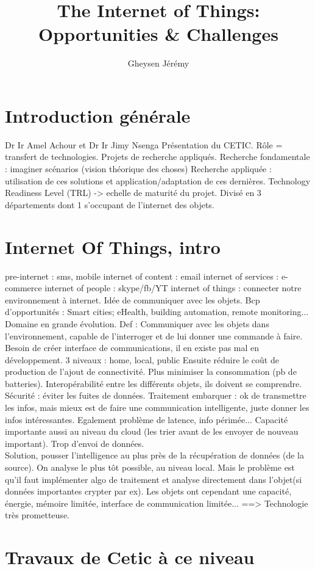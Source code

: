 \documentclass[10pt,a4paper]{article}
\author{Gheysen Jérémy}
\title{The Internet of Things: Opportunities \& Challenges}
\begin{document}
\maketitle
\newpage
\section{Introduction générale}
Dr Ir Amel Achour et Dr Ir Jimy Nsenga
Présentation du CETIC. Rôle = transfert de technologies. Projets de recherche appliqués. 
Recherche fondamentale : imaginer scénarios (vision théorique des choses)
Recherche appliquée : utilisation de ces solutions et application/adaptation de ces dernières. 
Technology Readiness Level (TRL) -> echelle de maturité du projet. 
Divisé en 3 départements dont 1 s'occupant de l'internet des objets.
\section{Internet Of Things, intro}
pre-internet : sms, mobile 
internet of content : email
internet of services : e-commerce
internet of people : skype/fb/YT
internet of things : connecter notre environnement à internet. Idée de communiquer avec les objets. 
Bcp d'opportunités : Smart cities; eHealth, building automation, remote monitoring... Domaine en grande évolution. 
Def : Communiquer avec les objets dans l'environnement, capable de l'interroger et de lui donner une commande à faire. 
Besoin de créer interface de communications, il en existe pas mal en développement. 
3 niveaux : home, local, public
Ensuite réduire le coût de production de l'ajout de connectivité. Plus minimiser la consommation (pb de batteries). 
Interopérabilité entre les différents objets, ils doivent se comprendre. 
Sécurité : éviter les fuites de données.
Traitement embarquer : ok de transmettre les infos, mais mieux est de faire une communication intelligente, juste donner les infos intéressantes. 
Egalement problème de latence, info périmée... 
Capacité importante aussi au niveau du cloud (les trier avant de les envoyer de nouveau important). Trop d'envoi de données. \\
Solution, pousser l'intelligence au plus près de la récupération de données (de la source). On analyse le plus tôt possible, au niveau local. Mais le problème est qu'il faut implémenter algo de traitement et analyse directement dans l'objet(si données importantes crypter par ex). Les objets ont cependant une capacité, énergie, mémoire limitée, interface de communication limitée...
==> Technologie très prometteuse. 
\section{Travaux de Cetic à ce niveau}
\end{document}
